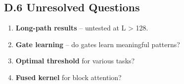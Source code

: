 \subsection{D.6 Unresolved Questions}

\begin{enumerate}
\item \textbf{Long-path results} -- untested at L \textgreater{} 128.
\item \textbf{Gate learning} -- do gates learn meaningful patterns?
\item \textbf{Optimal threshold} for various tasks?
\item \textbf{Fused kernel} for block attention?

\end{enumerate}
